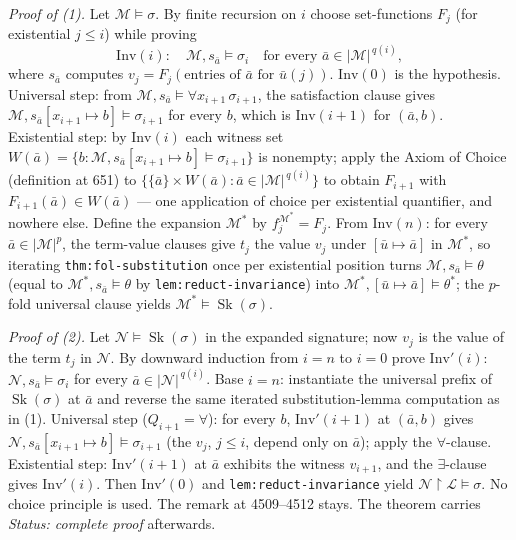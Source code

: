 \emph{Proof of (1).}  Let \(\mathcal{M}\models\sigma\).  By finite recursion on
\(i\) choose set-functions \(F_j\) (for existential \(j\le i\)) while proving
\[
 \mathrm{Inv}(i):\quad
 \mathcal{M},s_{\bar a}\models\sigma_i
 \quad\text{for every }\bar a\in|\mathcal{M}|^{\,q(i)},
\]
where \(s_{\bar a}\) computes \(v_j=F_j(\text{entries of }\bar a\text{ for }
\bar u(j))\).  \(\mathrm{Inv}(0)\) is the hypothesis.  Universal step: from
\(\mathcal{M},s_{\bar a}\models\forall x_{i+1}\,\sigma_{i+1}\), the
satisfaction clause gives \(\mathcal{M},s_{\bar a}[x_{i+1}\mapsto b]\models
\sigma_{i+1}\) for every \(b\), which is \(\mathrm{Inv}(i+1)\) for
\((\bar a,b)\).  Existential step: by \(\mathrm{Inv}(i)\) each witness set
\(W(\bar a)=\{b:\mathcal{M},s_{\bar a}[x_{i+1}\mapsto b]\models\sigma_{i+1}\}\)
is nonempty; apply the Axiom of Choice (definition at 651) to
\(\{\{\bar a\}\times W(\bar a):\bar a\in|\mathcal{M}|^{\,q(i)}\}\) to obtain
\(F_{i+1}\) with \(F_{i+1}(\bar a)\in W(\bar a)\) --- one application of choice
per existential quantifier, and nowhere else.  Define the expansion
\(\mathcal{M}^{*}\) by \(f_j^{\mathcal{M}^{*}}=F_j\).  From
\(\mathrm{Inv}(n)\): for every \(\bar a\in|\mathcal{M}|^{p}\), the term-value
clauses give \(t_j\) the value \(v_j\) under \([\bar u\mapsto\bar a]\) in
\(\mathcal{M}^{*}\), so iterating \texttt{thm:fol-substitution} once per
existential position turns \(\mathcal{M},s_{\bar a}\models\theta\) (equal to
\(\mathcal{M}^{*},s_{\bar a}\models\theta\) by \texttt{lem:reduct-invariance})
into \(\mathcal{M}^{*},[\bar u\mapsto\bar a]\models\theta^{*}\); the
\(p\)-fold universal clause yields
\(\mathcal{M}^{*}\models\operatorname{Sk}(\sigma)\).

\emph{Proof of (2).}  Let \(\mathcal{N}\models\operatorname{Sk}(\sigma)\) in
the expanded signature; now \(v_j\) is the value of the term \(t_j\) in
\(\mathcal{N}\).  By downward induction from \(i=n\) to \(i=0\) prove
\(\mathrm{Inv}'(i)\): \(\mathcal{N},s_{\bar a}\models\sigma_i\) for every
\(\bar a\in|\mathcal{N}|^{\,q(i)}\).  Base \(i=n\): instantiate the universal
prefix of \(\operatorname{Sk}(\sigma)\) at \(\bar a\) and reverse the same
iterated substitution-lemma computation as in (1).  Universal step
(\(Q_{i+1}=\forall\)): for every \(b\), \(\mathrm{Inv}'(i+1)\) at
\((\bar a,b)\) gives \(\mathcal{N},s_{\bar a}[x_{i+1}\mapsto b]\models
\sigma_{i+1}\) (the \(v_j\), \(j\le i\), depend only on \(\bar a\)); apply the
\(\forall\)-clause.  Existential step: \(\mathrm{Inv}'(i+1)\) at \(\bar a\)
exhibits the witness \(v_{i+1}\), and the \(\exists\)-clause gives
\(\mathrm{Inv}'(i)\).  Then \(\mathrm{Inv}'(0)\) and
\texttt{lem:reduct-invariance} yield
\(\mathcal{N}\mathbin{\upharpoonright}\mathcal{L}\models\sigma\).  No choice
principle is used.  The remark at 4509--4512 stays.  The theorem carries
\textit{Status: complete proof} afterwards.

